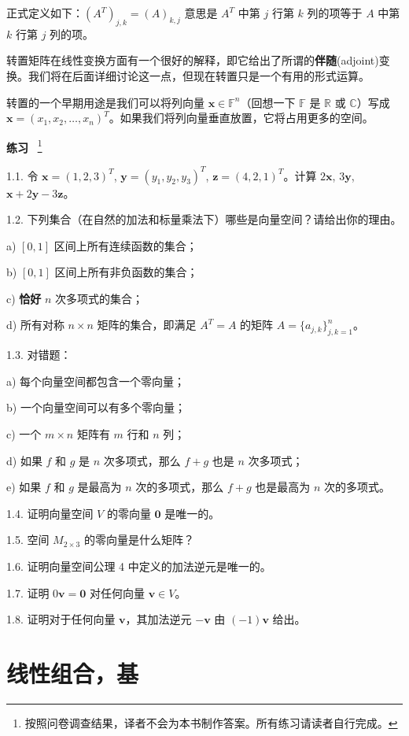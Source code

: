 正式定义如下：$(A^T)_{j,k} = (A)_{k,j}$ 意思是 $A^T$ 中第 $j$ 行第 $k$ 列的项等于 $A$ 中第 $k$ 行第 $j$ 列的项。

转置矩阵在线性变换方面有一个很好的解释，即它给出了所谓的\textbf{伴随}(adjoint)变换。我们将在后面详细讨论这一点，但现在转置只是一个有用的形式运算。

转置的一个早期用途是我们可以将列向量 $\mathbf{x} \in \mathbb{F}^n$（回想一下 $\mathbb{F}$ 是 $\mathbb{R}$ 或 $\mathbb{C}$）写成 $\mathbf{x} = (x_1, x_2, \dots, x_n)^T$。如果我们将列向量垂直放置，它将占用更多的空间。

\textbf{练习}~
\footnote{
按照问卷调查结果，译者不会为本书制作答案。所有练习请读者自行完成。
}

1.1. 令 $\mathbf{x} = (1, 2, 3)^T$, $\mathbf{y} = (y_1, y_2, y_3)^T$, $\mathbf{z} = (4, 2, 1)^T$。计算 $2\mathbf{x}$, $3\mathbf{y}$, $\mathbf{x} + 2\mathbf{y} - 3\mathbf{z}$。

1.2. 下列集合（在自然的加法和标量乘法下）哪些是向量空间？请给出你的理由。

a) $[0, 1]$ 区间上所有连续函数的集合；

b) $[0, 1]$ 区间上所有非负函数的集合；

c) \textbf{恰好} $n$ 次多项式的集合；

d) 所有对称 $n \times n$ 矩阵的集合，即满足 $A^T = A$ 的矩阵 $A = \{a_{j,k}\}_{j,k=1}^n $。


1.3. 对错题：

a) 每个向量空间都包含一个零向量；

b) 一个向量空间可以有多个零向量；

c) 一个 $m \times n$ 矩阵有 $m$ 行和 $n$ 列；

d) 如果 $f$ 和 $g$ 是 $n$ 次多项式，那么 $f+g$ 也是 $n$ 次多项式；

e) 如果 $f$ 和 $g$ 是最高为 $n$ 次的多项式，那么 $f+g$ 也是最高为 $n$ 次的多项式。

1.4. 证明向量空间 $V$ 的零向量 $\mathbf{0}$ 是唯一的。

1.5. 空间 $M_{2 \times 3}$ 的零向量是什么矩阵？

1.6. 证明向量空间公理 4 中定义的加法逆元是唯一的。

1.7. 证明 $0 \mathbf{v} = \mathbf{0}$ 对任何向量 $\mathbf{v} \in V$。

1.8. 证明对于任何向量 $\mathbf{v}$，其加法逆元 $-\mathbf{v}$ 由 $(-1)\mathbf{v}$ 给出。



\section{线性组合，基}

